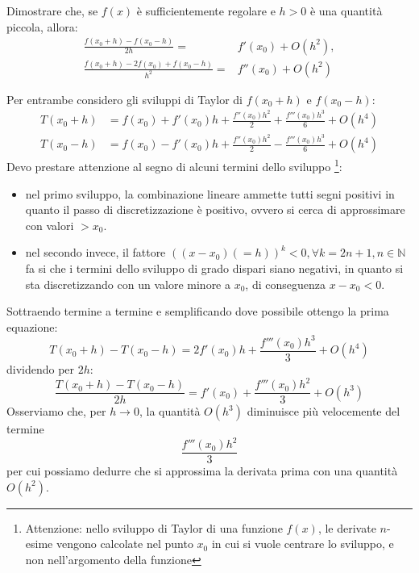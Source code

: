 \begin{exercise}[1.2]
	Dimostrare che, se $f(x)$ \`e sufficientemente regolare e $h>0$ \`e una 
	quantit\`a piccola, allora:
	\begin{equation*}
		\begin{split}
			\frac{f(x_{0}+h) - f(x_{0}-h)}{2h} =& f'(x_{0}) + O(h^{2}), \\
			\frac{f(x_{0}+h) - 2f(x_{0}) + f(x_{0}-h)}{h^{2}} =& f''(x_{0}) + O(h^{2}) 
		\end{split}
	\end{equation*}
\end{exercise}
Per entrambe considero gli sviluppi di Taylor di $f(x_{0}+h)$ e $f(x_{0}-h)$: 
\begin{equation*}
	\begin{split}
		T(x_{0} + h)& = f(x_{0}) + f'(x_{0})h + \frac{f''(x_{0})h^{2}}{2} + 
		\frac{f'''(x_{0})h^{3}}{6} + O(h^{4}) \\ 
		T(x_{0} - h)& = f(x_{0}) - f'(x_{0})h + \frac{f''(x_{0})h^{2}}{2} - 
		\frac{f'''(x_{0})h^{3}}{6} + O(h^{4})
	\end{split}
\end{equation*}
Devo prestare attenzione al segno di alcuni termini dello sviluppo
\footnote{Attenzione: nello sviluppo di Taylor di una funzione $f(x)$,  le
derivate $n$-esime vengono calcolate nel punto $x_{0}$ in cui si vuole 
centrare lo sviluppo, e non nell'argomento della funzione}:
\begin{itemize}
	\item nel primo sviluppo, la combinazione lineare ammette tutti segni 
	positivi in quanto il passo di discretizzazione \`e positivo, ovvero si cerca
	di approssimare con valori $ > x_{0}$.
	\item nel secondo invece, il fattore $((x - x_{0}) (=h))^{k} < 0, 
	\forall{k=2n+1, n \in \mathbb{N}}$ fa si che i termini dello sviluppo di 
	grado dispari siano negativi, in quanto si sta discretizzando con un valore 
	minore a $x_{0}$, di conseguenza $x - x_{0} < 0$.
\end{itemize}
Sottraendo termine a termine e semplificando dove possibile ottengo la prima equazione: 
\begin{equation*}
	T(x_{0}+h) - T(x_{0}-h) = 2f'(x_{0})h + \frac{f'''(x_{0})h^{3}}{3} + O(h^{4}) 
\end{equation*}
dividendo per $2h$: 
\begin{equation*}
	\frac{T(x_{0}+h) - T(x_{0}-h)}{2h} = f'(x_{0}) + \frac{f'''(x_{0})h^{2}}{3}  +
	O(h^{3})
\end{equation*}
Osserviamo che, per $h \rightarrow 0$, la quantit\`a $O(h^{3})$ diminuisce pi\`u 
velocemente del termine $$\frac{f'''(x_{0})h^{2}}{3}$$ per cui possiamo dedurre
che si approssima la derivata prima con una quantit\`a $O(h^{2})$.

